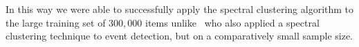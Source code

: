 \documentclass{../acm_proc_article-me11_tweaked}
\begin{document}
In this way we were able to successfully apply the spectral clustering algorithm to the large training set of $300,000$ items unlike~\citet{} who also applied a spectral clustering technique to event detection, but on a comparatively small sample size.














\end{document}
